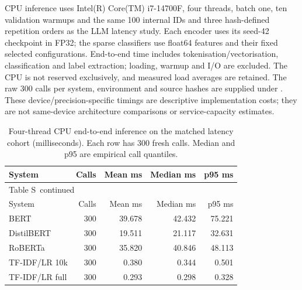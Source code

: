 \documentclass[10pt,a4paper]{article}
\renewcommand{\thetable}{S\arabic{table}}
\begin{document}
CPU inference uses Intel(R) Core(TM) i7-14700F, four threads, batch one, ten validation warmups and the same 100 internal IDs and three hash-defined repetition orders as the LLM latency study. Each encoder uses its seed-42 checkpoint in FP32; the sparse classifiers use float64 features and their fixed selected configurations. End-to-end time includes tokenisation/vectorisation, classification and label extraction; loading, warmup and I/O are excluded. The CPU is not reserved exclusively, and measured load averages are retained. The raw 300 calls per system, environment and source hashes are supplied under . These device/precision-specific timings are descriptive implementation costs; they are not same-device architecture comparisons or service-capacity estimates.


{\small
\setlength{\tabcolsep}{4pt}
\begin{longtable}{@{}lrrrr@{}}
\caption{Four-thread CPU end-to-end inference on the matched latency cohort (milliseconds). Each row has 300 fresh calls. Median and p95 are empirical call quantiles.}\label{sup:cpu-latency}\\
\toprule
System & Calls & Mean ms & Median ms & p95 ms \\
\midrule\endfirsthead
\multicolumn{5}{l}{\small Table \thetable\ continued}\\
\toprule
System & Calls & Mean ms & Median ms & p95 ms \\
\midrule\endhead
\bottomrule\endfoot
BERT & 300 & 39.678 & 42.432 & 75.221 \\
DistilBERT & 300 & 19.511 & 21.117 & 32.631 \\
RoBERTa & 300 & 35.820 & 40.846 & 48.113 \\
TF-IDF/LR 10k & 300 & 0.380 & 0.344 & 0.501 \\
TF-IDF/LR full & 300 & 0.293 & 0.298 & 0.328 \\
\end{longtable}
}
\end{document}
